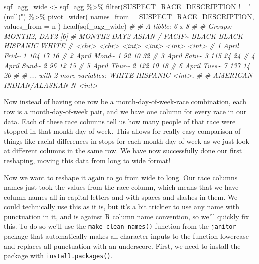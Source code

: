 \documentclass[
  a4paper,
]{krantz}
\makeatletter
\newenvironment{Shaded}{\begin{snugshade}}{\end{snugshade}}
\newcommand{\AttributeTok}[1]{\textcolor[rgb]{0.61,0.61,0.61}{#1}}
\newcommand{\CommentTok}[1]{\textcolor[rgb]{0.37,0.37,0.37}{\textit{#1}}}
\newcommand{\FunctionTok}[1]{\textcolor[rgb]{0,0,0}{#1}}
\newcommand{\NormalTok}[1]{#1}
\newcommand{\OtherTok}[1]{\textcolor[rgb]{0.37,0.37,0.37}{#1}}
\newcommand{\SpecialCharTok}[1]{\textcolor[rgb]{0,0,0}{#1}}
\newcommand{\StringTok}[1]{\textcolor[rgb]{0.5,0.5,0.5}{#1}}
\newenvironment{kframe}{%
\medskip{}
\setlength{\fboxsep}{.8em}
 \def\at@end@of@kframe{}%
 \ifinner\ifhmode%
  \def\at@end@of@kframe{\end{minipage}}%
  \begin{minipage}{\columnwidth}%
 \fi\fi%
 \def\FrameCommand##1{\hskip\@totalleftmargin \hskip-\fboxsep
 \colorbox{shadecolor}{##1}\hskip-\fboxsep
     \hskip-\linewidth \hskip-\@totalleftmargin \hskip\columnwidth}%
 \MakeFramed {\advance\hsize-\width
   \@totalleftmargin\z@ \linewidth\hsize
   \@setminipage}}%
 {\par\unskip\endMakeFramed%
 \at@end@of@kframe}
\renewenvironment{Shaded}{\begin{kframe}}{\end{kframe}}
\makeatother
\begin{document}
\begin{Shaded}
\begin{Highlighting}[]
\NormalTok{sqf\_agg\_wide }\OtherTok{\textless{}{-}}\NormalTok{ sqf\_agg }\SpecialCharTok{\%\textgreater{}\%}
  \FunctionTok{filter}\NormalTok{(SUSPECT\_RACE\_DESCRIPTION }\SpecialCharTok{!=} \StringTok{"(null)"}\NormalTok{) }\SpecialCharTok{\%\textgreater{}\%}
  \FunctionTok{pivot\_wider}\NormalTok{(}
    \AttributeTok{names\_from =}\NormalTok{ SUSPECT\_RACE\_DESCRIPTION,}
    \AttributeTok{values\_from =}\NormalTok{ n}
\NormalTok{  )}
\FunctionTok{head}\NormalTok{(sqf\_agg\_wide)}
\CommentTok{\# \# A tibble: 6 x 8}
\CommentTok{\# \# Groups:   MONTH2, DAY2 [6]}
\CommentTok{\#   MONTH2 DAY2  \textasciigrave{}ASIAN / PACIF\textasciitilde{}\textasciigrave{} BLACK \textasciigrave{}BLACK HISPANIC\textasciigrave{} WHITE}
\CommentTok{\#   \textless{}chr\textgreater{}  \textless{}chr\textgreater{}            \textless{}int\textgreater{} \textless{}int\textgreater{}            \textless{}int\textgreater{} \textless{}int\textgreater{}}
\CommentTok{\# 1 April  Frid\textasciitilde{}                1   104               17    16}
\CommentTok{\# 2 April  Mond\textasciitilde{}                1    92               10    32}
\CommentTok{\# 3 April  Satu\textasciitilde{}                3   115               24    24}
\CommentTok{\# 4 April  Sund\textasciitilde{}                2    96               12    15}
\CommentTok{\# 5 April  Thur\textasciitilde{}                2   122               10    18}
\CommentTok{\# 6 April  Tues\textasciitilde{}                7   137               14    20}
\CommentTok{\# \# ... with 2 more variables: \textasciigrave{}WHITE HISPANIC\textasciigrave{} \textless{}int\textgreater{},}
\CommentTok{\# \#   \textasciigrave{}AMERICAN INDIAN/ALASKAN N\textasciigrave{} \textless{}int\textgreater{}}
\end{Highlighting}
\end{Shaded}

Now instead of having one row be a month-day-of-week-race
combination, each row is a month-day-of-week pair, and we
have one column for every race in our data. Each of these
race columns tell us how many people of that race were
stopped in that month-day-of-week. This allows for really
easy comparison of things like racial differences in stops
for each month-day-of-week as we just look at different
columns in the same row. We have now successfully done our
first reshaping, moving this data from long to wide format!

Now we want to reshape it again to go from wide to long. Our
race columns names just took the values from the race
column, which means that we have column names all in capital
letters and with spaces and slashes in them. We could
technically use this as it is, but it's a bit trickier to
use any name with punctuation in it, and is against R column
name convention, so we'll quickly fix this. To do so we'll
use the \texttt{make\_clean\_names()} function from the
\texttt{janitor} package that automatically makes all
character inputs to the function lowercase and replaces all
punctuation with an underscore. First, we need to install
the package with \texttt{install.packages()}.
\end{document}

